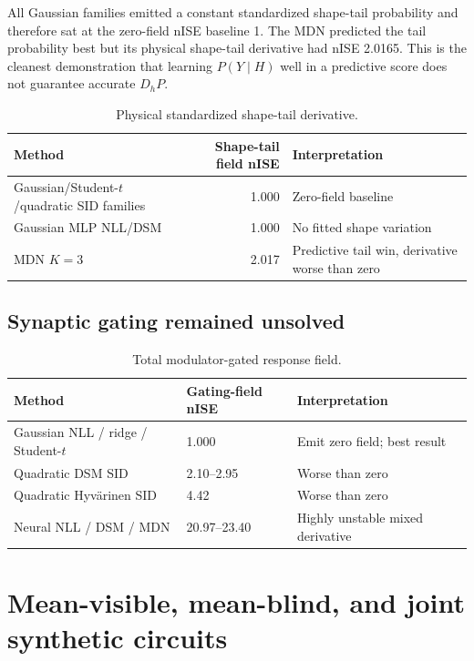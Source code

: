 \documentclass[10pt]{article}
\begin{document}
All Gaussian families emitted a constant standardized shape-tail probability and therefore sat at the zero-field nISE baseline 1. The MDN predicted the tail probability best but its physical shape-tail derivative had nISE 2.0165. This is the cleanest demonstration that learning $P(Y\mid H)$ well in a predictive score does not guarantee accurate $D_hP$.

\begin{table}[H]
\centering\small
\begin{tabularx}{0.88\linewidth}{Y r Y}
\toprule Method & Shape-tail field nISE & Interpretation \\
\midrule
Gaussian/Student-$t$/quadratic SID families & 1.000 & Zero-field baseline \\
Gaussian MLP NLL/DSM & 1.000 & No fitted shape variation \\
MDN $K=3$ & 2.017 & Predictive tail win, derivative worse than zero \\
\bottomrule
\end{tabularx}
\caption{Physical standardized shape-tail derivative.}
\end{table}

\subsection{Synaptic gating remained unsolved}

\begin{table}[H]
\centering\small
\begin{tabularx}{0.90\linewidth}{Y L{2.5cm} Y}
\toprule Method & Gating-field nISE & Interpretation \\
\midrule
Gaussian NLL / ridge / Student-$t$ & 1.000 & Emit zero field; best result \\
Quadratic DSM SID & 2.10--2.95 & Worse than zero \\
Quadratic Hyv\"arinen SID & 4.42 & Worse than zero \\
Neural NLL / DSM / MDN & 20.97--23.40 & Highly unstable mixed derivative \\
\bottomrule
\end{tabularx}
\caption{Total modulator-gated response field.}
\end{table}

\section{Mean-visible, mean-blind, and joint synthetic circuits}
\end{document}
